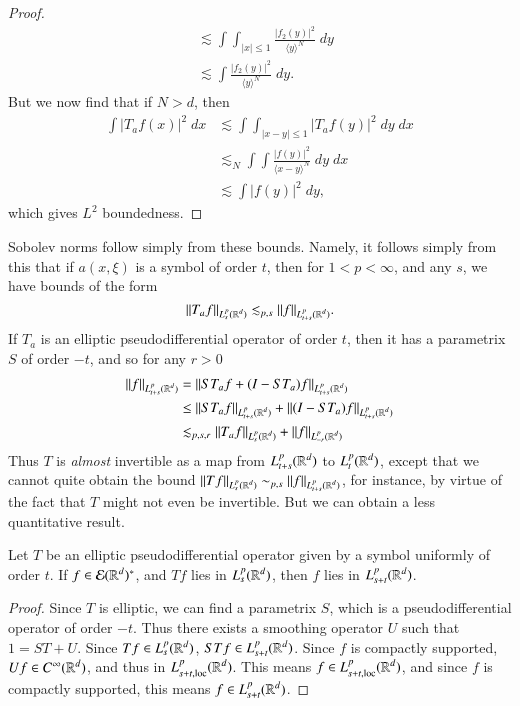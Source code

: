 \begin{proof}
\begin{align*}
        &\lesssim \int \int_{|x| \leq 1} \frac{|f_2(y)|^2}{\langle y \rangle^N}\; dy\\
        &\lesssim \int \frac{|f_2(y)|^2}{\langle y \rangle^N}\; dy.
    \end{align*}
    But we now find that if $N > d$, then
    \begin{align*}
        \int |T_af(x)|^2\; dx &\lesssim \int \int_{|x - y| \leq 1} |T_af(y)|^2\; dy\; dx\\
        &\lesssim_N \int \int \frac{|f(y)|^2}{\langle x - y \rangle^N}\; dy\; dx\\
        &\lesssim \int |f(y)|^2\; dy,
    \end{align*}
    which gives $L^2$ boundedness.
\end{proof}

Sobolev norms follow simply from these bounds. Namely, it follows simply from this that if $a(x,\xi)$ is a symbol of order $t$, then for $1 < p < \infty$, and any $s$, we have bounds of the form
%
\[ \| T_a f \|_{L^p_s(\operatorname{\mathbb{R}}^d)} \lesssim_{p,s} \| f \|_{L^p_{t + s}(\operatorname{\mathbb{R}}^d)}. \]
%
If $T_a$ is an elliptic pseudodifferential operator of order $t$, then it has a parametrix $S$ of order $-t$, and so for any $r > 0$
%
\begin{align*}
    \| f \|_{L^p_{t + s}(\operatorname{\mathbb{R}}^d)} &= \| ST_a f + (I - ST_a) f \|_{L^p_{t+s}(\operatorname{\mathbb{R}}^d)}\\
    &\leq \| ST_a f \|_{L^p_{t+s}(\operatorname{\mathbb{R}}^d)} + \| (I - ST_a) f \|_{L^p_{t+s}(\operatorname{\mathbb{R}}^d)}\\
    &\lesssim_{p,s,r} \| T_a f \|_{L^p_s(\operatorname{\mathbb{R}}^d)} + \| f \|_{L^p_{-r}(\operatorname{\mathbb{R}}^d)} 
\end{align*}
%
Thus $T$ is \emph{almost} invertible as a map from $L^p_{t+s}(\operatorname{\mathbb{R}}^d)$ to $L^p_t(\operatorname{\mathbb{R}}^d)$, except that we cannot quite obtain the bound $\| T f \|_{L^p_s(\operatorname{\mathbb{R}}^d)} \sim_{p,s} \| f \|_{L^p_{t + s}(\operatorname{\mathbb{R}}^d)}$, for instance, by virtue of the fact that $T$ might not even be invertible. But we can obtain a less quantitative result.

\begin{theorem}
    Let $T$ be an elliptic pseudodifferential operator given by a symbol uniformly of order $t$. If $f \in \mathcal{E}(\operatorname{\mathbb{R}}^d)^*$, and $Tf$ lies in $L^p_s(\operatorname{\mathbb{R}}^d)$, then $f$ lies in $L^p_{s + t}(\operatorname{\mathbb{R}}^d)$.
\end{theorem}
\begin{proof}
    Since $T$ is elliptic, we can find a parametrix $S$, which is a pseudodifferential operator of order $-t$. Thus there exists a smoothing operator $U$ such that $1 = ST + U$. Since $Tf \in L^p_s(\operatorname{\mathbb{R}}^d)$, $STf \in L^p_{s + t}(\operatorname{\mathbb{R}}^d)$. Since $f$ is compactly supported, $Uf \in C^\infty(\operatorname{\mathbb{R}}^d)$, and thus in $L^p_{s+t,\text{loc}}(\operatorname{\mathbb{R}}^d)$. This means $f \in L^p_{s+t,\text{loc}}(\operatorname{\mathbb{R}}^d)$, and since $f$ is compactly supported, this means $f \in L^p_{s+t}(\operatorname{\mathbb{R}}^d)$.
\end{proof}
















